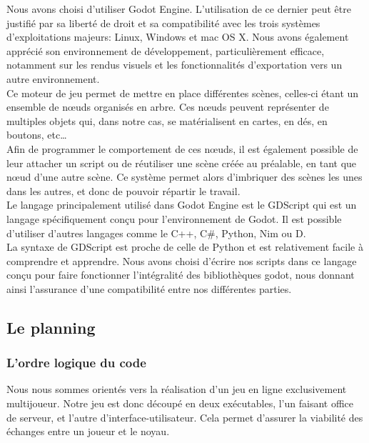 \documentclass[a4paper,11pt]{article}
\begin{document}
Nous avons choisi d’utiliser Godot Engine. L’utilisation de ce dernier peut être justifié par sa liberté de droit et sa compatibilité avec les trois systèmes d’exploitations majeurs: Linux, Windows et mac OS X. Nous avons également apprécié son environnement de développement, particulièrement efficace, notamment sur les rendus visuels et les fonctionnalités d’exportation vers un autre environnement. \\

Ce moteur de jeu permet de mettre en place différentes scènes, celles-ci étant un ensemble de nœuds organisés en arbre. Ces nœuds peuvent représenter de multiples objets qui, dans notre cas, se matérialisent en cartes, en dés, en boutons, etc… \\

Afin de programmer le comportement de ces nœuds, il est également possible de leur attacher un script ou de réutiliser une scène créée au préalable, en tant que nœud d’une autre scène. Ce système permet alors d’imbriquer des scènes les unes dans les autres, et donc de pouvoir répartir le travail. \\

Le langage principalement utilisé dans Godot Engine est le GDScript qui est un langage spécifiquement conçu pour l’environnement de Godot. Il est possible d’utiliser d’autres langages comme le C++, C\#, Python, Nim ou D. \\
 
La syntaxe de GDScript est proche de celle de Python et est relativement facile à comprendre et apprendre. Nous avons choisi d’écrire nos scripts dans ce langage conçu pour faire fonctionner l’intégralité des bibliothèques godot, nous donnant ainsi l’assurance d’une compatibilité entre nos différentes parties. 


\subsection{Le planning}
\subsubsection{L'ordre logique du code}

Nous nous sommes orientés vers la réalisation d’un jeu en ligne exclusivement multijoueur. Notre jeu est donc découpé en deux exécutables, l’un faisant office de serveur, et l’autre d’interface-utilisateur. Cela permet d’assurer la viabilité des échanges entre un joueur et le noyau. 
\end{document}
